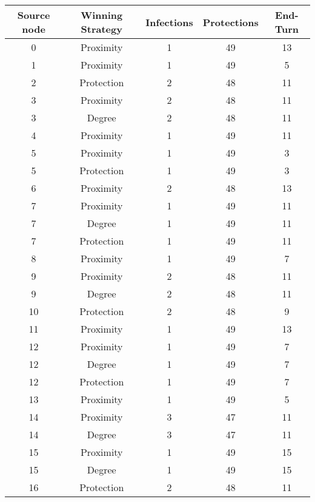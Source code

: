 \documentclass[results.tex]{subfiles}
\begin{document}
\begin{center}
  \begin{tabular}{| c || c | c | c | c |}
    \hline
    {\bfseries Source node} & {\bfseries Winning Strategy} & {\bfseries Infections} & {\bfseries Protections} & {\bfseries End-Turn} \\  %
    \hline\hline
    0 & Proximity & 1 & 49 & 13 \\ 
    \hline
    1 & Proximity & 1 & 49 & 5 \\ 
    \hline
    2 & Protection & 2 & 48 & 11 \\ 
    \hline
    3 & Proximity & 2 & 48 & 11 \\ 
    \hline
    3 & Degree & 2 & 48 & 11 \\ 
    \hline
    4 & Proximity & 1 & 49 & 11 \\ 
    \hline
    5 & Proximity & 1 & 49 & 3 \\ 
    \hline
    5 & Protection & 1 & 49 & 3 \\ 
    \hline
    6 & Proximity & 2 & 48 & 13 \\ 
    \hline
    7 & Proximity & 1 & 49 & 11 \\ 
    \hline
    7 & Degree & 1 & 49 & 11 \\ 
    \hline
    7 & Protection & 1 & 49 & 11 \\ 
    \hline
    8 & Proximity & 1 & 49 & 7 \\ 
    \hline
    9 & Proximity & 2 & 48 & 11 \\ 
    \hline
    9 & Degree & 2 & 48 & 11 \\ 
    \hline
    10 & Protection & 2 & 48 & 9 \\ 
    \hline
    11 & Proximity & 1 & 49 & 13 \\ 
    \hline
    12 & Proximity & 1 & 49 & 7 \\ 
    \hline
    12 & Degree & 1 & 49 & 7 \\ 
    \hline
    12 & Protection & 1 & 49 & 7 \\ 
    \hline
    13 & Proximity & 1 & 49 & 5 \\ 
    \hline
    14 & Proximity & 3 & 47 & 11 \\ 
    \hline
    14 & Degree & 3 & 47 & 11 \\ 
    \hline
    15 & Proximity & 1 & 49 & 15 \\ 
    \hline
    15 & Degree & 1 & 49 & 15 \\ 
    \hline
    16 & Protection & 2 & 48 & 11 \\ 
    \hline

\end{tabular}
\end{center}
\end{document}
